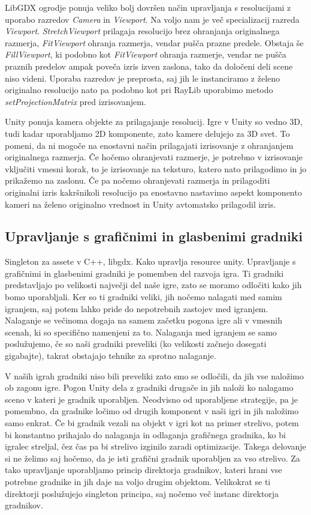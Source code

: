 \documentclass[12pt,a4paper,twoside]{book}
\begin{document}
LibGDX ogrodje ponuja veliko bolj dovršen način upravljanja s resolucijami z uporabo razredov \textit{Camera} in \textit{Viewport}. Na voljo nam je več specializacij razreda \textit{Viewport}. \textit{StretchViewport} prilagaja resolucijo brez ohranjanja originalnega razmerja, \textit{FitViewport} ohranja razmerja, vendar pušča prazne predele. Obstaja še \textit{FillViewport}, ki podobno kot \textit{FitViewport} ohranja razmerje, vendar ne pušča praznih predelov ampak poveča izris izven zaslona, tako da določeni deli scene niso videni. Uporaba razredov je preprosta, saj jih le instanciramo z želeno originalno resolucijo nato pa podobno kot pri RayLib uporabimo metodo \textit{setProjectionMatrix} pred izrisovanjem.

Unity ponuja kamera objekte za prilagajanje resolucij. Igre v Unity so vedno 3D, tudi kadar uporabljamo 2D komponente, zato kamere delujejo za 3D svet. To pomeni, da ni mogoče na enostavni način prilagajati izrisovanje z ohranjanjem originalnega razmerja. Če hočemo ohranjevati razmerje, je potrebno v izrisovanje vključiti vmesni korak, to je izrisovanje na teksturo, katero nato prilagodimo in jo prikažemo na zaslonu. Če pa nočemo ohranjevati razmerja in prilagoditi originalni izris kakršnikoli resolucijo pa enostavno nastavimo aspekt komponento kameri na želeno originalno vrednost in Unity avtomatsko prilagodil izris.

\subsection{Upravljanje s grafičnimi in glasbenimi gradniki}
Singleton za assete v C++, libgdx. Kako upravlja resource unity.
Upravljanje s grafičnimi in glasbenimi gradniki je pomemben del razvoja igra. Ti gradniki predstavljajo po velikosti največji del naše igre, zato se moramo odločiti kako jih bomo uporabljali. Ker so ti gradniki veliki, jih nočemo nalagati med samim igranjem, saj potem lahko pride do nepotrebnih zastojev med igranjem. Nalaganje se večinoma dogaja na samem začetku pogona igre ali v vmesnih scenah, ki so specifično namenjeni za to. Nalaganja med igranjem se samo poslužujemo, če so naši gradniki preveliki (ko velikosti začnejo dosegati gigabajte), takrat obstajajo tehnike za sprotno nalaganje.

V naših igrah gradniki niso bili preveliki zato smo se odločili, da jih vse naložimo ob zagonu igre. Pogon Unity dela z gradniki drugače in jih naloži ko nalagamo sceno v kateri je gradnik uporabljen. Neodvisno od uporabljene strategije, pa je pomembno, da gradnike ločimo od drugih komponent v naši igri in jih naložimo samo enkrat. Če bi gradnik vezali na objekt v igri kot na primer strelivo, potem bi konstantno prihajalo do nalaganja in odlaganja grafičnega gradnika, ko bi igralec streljal, čez čas pa bi strelivo izginilo zaradi optimizacije. Takega delovanje si ne želimo saj hočemo, da je isti grafični gradnik uporabljen za vso strelivo. Za tako upravljanje uporabljamo princip direktorja gradnikov, kateri hrani vse potrebne gradnike in jih daje na voljo drugim objektom. Velikokrat se ti direktorji poslužujejo singleton principa, saj nočemo več instanc direktorja gradnikov.
\end{document}
